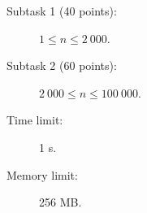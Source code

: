 \documentclass{boi2014}
\begin{document}
    \Scoring

    \begin{description}
        \item[Subtask 1 (40 points):] $1 \le n \le 2\ 000$.
        \item[Subtask 2 (60 points):] $2\ 000 \le n \le 100\ 000$.
    \end{description}

    \Constraints

    \begin{description}
        \item[Time limit:] 1 s.
        \item[Memory limit:] 256 MB.
    \end{description}
\end{document}
